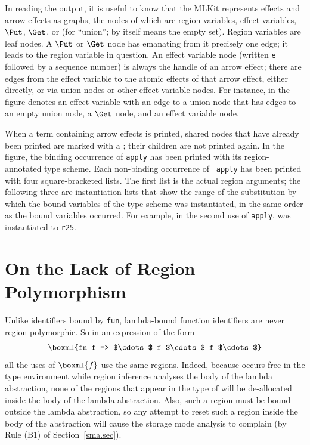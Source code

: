 \documentclass[12pt]{book}
\begin{document}
In reading the output, it is useful to know that the MLKit represents
effects and arrow effects as graphs, the nodes of which are region
variables, effect variables, $\Put$, $\Get$, or  (for
``union'';  by itself means the empty set).  Region variables
are leaf nodes. A $\Put$ or $\Get$ node has emanating from it
precisely one edge; it leads to the region variable in question.  An
effect variable node (written {\tt e} followed by a sequence number)
is always the handle of an arrow effect; there are edges from the
effect variable to the atomic effects of that arrow effect, either
directly, or via union nodes or other effect variable nodes.  For
instance,  in the figure denotes an
effect variable with an edge to a union node that has edges to an
empty union node, a $\Get$ node, and an effect variable node.

When a term containing arrow effects is printed, shared nodes that
have already been printed are marked with a ; their children
are not printed again.
In the figure, the binding occurrence of {\tt apply} has been printed
with its region-annotated type scheme. Each non-binding occurrence of {\tt
  apply} has been printed with four square-bracketed lists. The first
list is the actual region arguments; the following three are
instantiation lists that show the range of the substitution by
which the bound variables of the type scheme was instantiated, in the
same order as the bound variables occurred.  For example, in the
second use of {\tt apply},  was instantiated to {\tt r25}.

\section{On the Lack of Region Polymorphism}
Unlike identifiers bound by {\tt fun}, lambda-bound function
identifiers are never region-polymorphic. So in an expression of the
form
$$\boxml{fn f => $\cdots$ f $\cdots$ f $\cdots$}$$
all the uses of
$\boxml{f}$ use the same regions. Indeed, because  occurs
free in the type environment while region inference analyses the body
of the lambda abstraction, none of the regions that appear in the type
of  will be de-allocated inside the body of the lambda
abstraction. Also, such a region must be bound outside the lambda
abstraction, so any attempt to reset such a region inside the body of
the abstraction will cause the storage mode analysis to complain (by
Rule (B1) of Section~\ref{sma.sec}).
\end{document}
